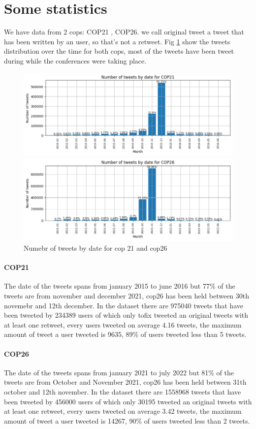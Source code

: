 \section{Some statistics}
We have data from 2 cops: COP21 , COP26.
we call original tweet a tweet that has been written by an user, so that's not a retweet. Fig \ref{fig:tweets_by_date} show the tweets distribution over the time for both cops, most of the tweets have been tweet during while the conferences were taking place.

\begin{figure}[H]
    \centering
    \includegraphics[width=0.75\linewidth ]{Chapter3/figures/tweets_by_date_cop21.png}

    \includegraphics[width=0.75\linewidth ]{Chapter3/figures/tweets_by_date_cop26.png}
    \caption{Numebr of tweets by date for cop 21 and cop26}
    \label{fig:tweets_by_date}
\end{figure}

\paragraph{COP21}
The date of the tweets spans from january 2015 to june 2016 but 77\% of the tweets are from november and december 2021, cop26 has been held between 30th novemebr and 12th december. In the dataset there are 975040 tweets that have been tweeted by 234389 users of which only tofix tweeted an original tweets with at least one retweet, every users tweeted on average 4.16 tweets, the maximum amount of tweet a user tweeted is 9635, 89\% of users tweeted less than 5 tweets.

\paragraph{COP26}
The date of the tweets spans from january 2021 to july 2022 but 81\% of the tweets are from October and November 2021, cop26 has been held between 31th october and 12th november. In the dataset there are 1558968 tweets that have been tweeted by 456000 users of which only 30195 tweeted an original tweets with at least one retweet, every users tweeted on average 3.42 tweets, the maximum amount of tweet a user tweeted is 14267, 90\% of users tweeted less than 2 tweets.
\\


